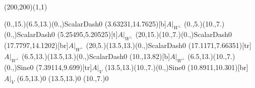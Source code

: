 \unitlength=1bp%

\begin{feynartspicture}(200,200)(1,1)

\FADiagram{}
\FAProp(0.,15.)(6.5,13.)(0.,){ScalarDash}{0}
\FALabel(3.63231,14.7625)[b]{$A|_{W^\perp}$}
\FAProp(0.,5.)(10.,7.)(0.,){ScalarDash}{0}
\FALabel(5.25495,5.20525)[t]{$A|_{W^\perp}$}
\FAProp(20,15.)(10.,7.)(0.,){ScalarDash}{0}
\FALabel(17.7797,14.1202)[br]{$A|_{W^\perp}$}
\FAProp(20,5.)(13.5,13.)(0.,){ScalarDash}{0}
\FALabel(17.1171,7.66351)[tr]{$A|_{W^\perp}$}
\FAProp(6.5,13.)(13.5,13.)(0.,){ScalarDash}{0}
\FALabel(10.,13.82)[b]{$A|_{W^\perp}$}
\FAProp(6.5,13.)(10.,7.)(0.,){Sine}{0}
\FALabel(7.39114,9.699)[tr]{$A|_V$}
\FAProp(13.5,13.)(10.,7.)(0.,){Sine}{0}
\FALabel(10.8911,10.301)[br]{$A|_V$}
\FAVert(6.5,13.){0}
\FAVert(13.5,13.){0}
\FAVert(10.,7.){0}
\end{feynartspicture}

